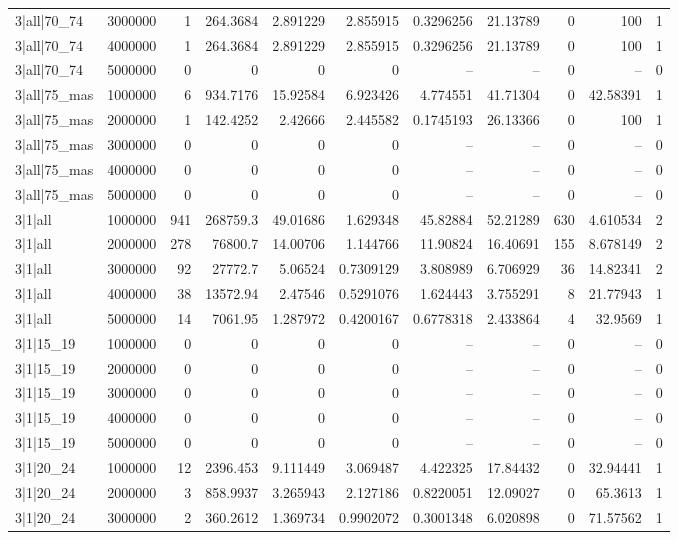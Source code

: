 \begin{tabular}{lrrrrrrrrrr}
3|all|70\_74 & 3000000 & 1 & 264.3684 & 2.891229 & 2.855915 & 0.3296256 & 21.13789 & 0 & 100 & 1 \\
3|all|70\_74 & 4000000 & 1 & 264.3684 & 2.891229 & 2.855915 & 0.3296256 & 21.13789 & 0 & 100 & 1 \\
3|all|70\_74 & 5000000 & 0 & 0 & 0 & 0 & -- & -- & 0 & -- & 0 \\
3|all|75\_mas & 1000000 & 6 & 934.7176 & 15.92584 & 6.923426 & 4.774551 & 41.71304 & 0 & 42.58391 & 1 \\
3|all|75\_mas & 2000000 & 1 & 142.4252 & 2.42666 & 2.445582 & 0.1745193 & 26.13366 & 0 & 100 & 1 \\
3|all|75\_mas & 3000000 & 0 & 0 & 0 & 0 & -- & -- & 0 & -- & 0 \\
3|all|75\_mas & 4000000 & 0 & 0 & 0 & 0 & -- & -- & 0 & -- & 0 \\
3|all|75\_mas & 5000000 & 0 & 0 & 0 & 0 & -- & -- & 0 & -- & 0 \\
3|1|all & 1000000 & 941 & 268759.3 & 49.01686 & 1.629348 & 45.82884 & 52.21289 & 630 & 4.610534 & 2 \\
3|1|all & 2000000 & 278 & 76800.7 & 14.00706 & 1.144766 & 11.90824 & 16.40691 & 155 & 8.678149 & 2 \\
3|1|all & 3000000 & 92 & 27772.7 & 5.06524 & 0.7309129 & 3.808989 & 6.706929 & 36 & 14.82341 & 2 \\
3|1|all & 4000000 & 38 & 13572.94 & 2.47546 & 0.5291076 & 1.624443 & 3.755291 & 8 & 21.77943 & 1 \\
3|1|all & 5000000 & 14 & 7061.95 & 1.287972 & 0.4200167 & 0.6778318 & 2.433864 & 4 & 32.9569 & 1 \\
3|1|15\_19 & 1000000 & 0 & 0 & 0 & 0 & -- & -- & 0 & -- & 0 \\
3|1|15\_19 & 2000000 & 0 & 0 & 0 & 0 & -- & -- & 0 & -- & 0 \\
3|1|15\_19 & 3000000 & 0 & 0 & 0 & 0 & -- & -- & 0 & -- & 0 \\
3|1|15\_19 & 4000000 & 0 & 0 & 0 & 0 & -- & -- & 0 & -- & 0 \\
3|1|15\_19 & 5000000 & 0 & 0 & 0 & 0 & -- & -- & 0 & -- & 0 \\
3|1|20\_24 & 1000000 & 12 & 2396.453 & 9.111449 & 3.069487 & 4.422325 & 17.84432 & 0 & 32.94441 & 1 \\
3|1|20\_24 & 2000000 & 3 & 858.9937 & 3.265943 & 2.127186 & 0.8220051 & 12.09027 & 0 & 65.3613 & 1 \\
3|1|20\_24 & 3000000 & 2 & 360.2612 & 1.369734 & 0.9902072 & 0.3001348 & 6.020898 & 0 & 71.57562 & 1 \\

\end{tabular}
